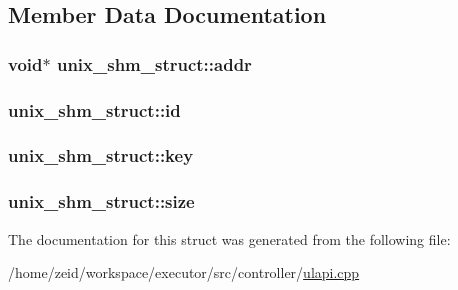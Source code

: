 \subsection{Member Data Documentation}
\hypertarget{structunix__shm__struct_a9b980afdce9971ca6d97ea23e73beaf9}{
\subsubsection[{addr}]{\setlength{\rightskip}{0pt plus 5cm}void$\ast$ {\bf unix\_\-shm\_\-struct::addr}}}
\label{structunix__shm__struct_a9b980afdce9971ca6d97ea23e73beaf9}
\hypertarget{structunix__shm__struct_a9cb6e66b6831674cdbb5bf4b2de0354b}{
\subsubsection[{id}]{ {\bf unix\_\-shm\_\-struct::id}}}
\label{structunix__shm__struct_a9cb6e66b6831674cdbb5bf4b2de0354b}
\hypertarget{structunix__shm__struct_aa1f214c8e4add2c4c7a3c31123193150}{
\subsubsection[{key}]{ {\bf unix\_\-shm\_\-struct::key}}}
\label{structunix__shm__struct_aa1f214c8e4add2c4c7a3c31123193150}
\hypertarget{structunix__shm__struct_a0e33a04868b3c80ee1897c521f27a7b4}{
\subsubsection[{size}]{ {\bf unix\_\-shm\_\-struct::size}}}
\label{structunix__shm__struct_a0e33a04868b3c80ee1897c521f27a7b4}


The documentation for this struct was generated from the following file:\begin{DoxyCompactItemize}
\item 
/home/zeid/workspace/executor/src/controller/\hyperlink{ulapi_8cpp}{ulapi.cpp}\end{DoxyCompactItemize}
